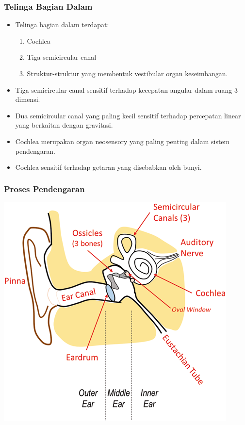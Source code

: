 \documentclass[pdflatex,compress]{beamer}
\begin{document}
\begin{frame}
	\frametitle{Telinga Bagian Dalam}
	\begin{itemize}
		\item Telinga bagian dalam terdapat:
		\begin{enumerate}
			\item Cochlea
			\item Tiga semicircular canal
			\item Struktur-struktur yang membentuk vestibular organ keseimbangan.
		\end{enumerate}
		\item Tiga semicircular canal sensitif terhadap kecepatan angular dalam ruang 3 dimensi.
		\item Dua semicircular canal yang paling kecil sensitif terhadap percepatan linear yang berkaitan dengan gravitasi.
		\item Cochlea merupakan organ neosensory yang paling penting dalam sistem pendengaran.
		\item Cochlea sensitif terhadap getaran yang disebabkan oleh bunyi.
	\end{itemize}
\end{frame}

\begin{frame}
	\frametitle{Proses Pendengaran}
	\begin{center}
		\includegraphics[height=0.9\textheight]{img/img015}
	\end{center}
\end{frame}
\end{document}
